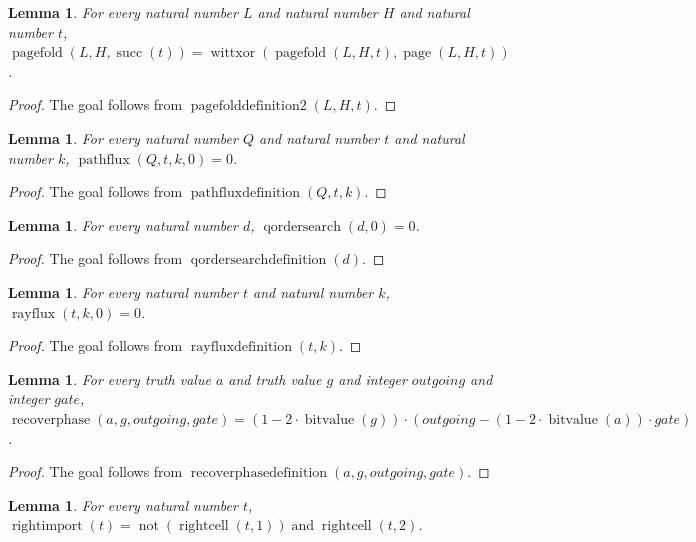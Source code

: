 \documentclass[11pt]{article}
\newtheorem{lemma}[theorem]{Lemma}
\theoremstyle{definition}
\begin{document}
\begin{lemma}
\label{ll:observations:page-fold-definition-2}
For every natural number \(L\) and natural number \(H\) and natural number \(t\), \(\operatorname{pagefold}(L, H, \operatorname{succ}(t)) = \operatorname{wittxor}(\operatorname{pagefold}(L, H, t), \operatorname{page}(L, H, t))\).
\end{lemma}
\begin{proof}
The goal follows from \(\operatorname{pagefolddefinition2}(L, H, t)\).
\end{proof}
\begin{lemma}
\label{ll:observations:path-flux-definition}
For every natural number \(Q\) and natural number \(t\) and natural number \(k\), \(\operatorname{pathflux}(Q, t, k, 0) = 0\).
\end{lemma}
\begin{proof}
The goal follows from \(\operatorname{pathfluxdefinition}(Q, t, k)\).
\end{proof}
\begin{lemma}
\label{ll:observations:q-order-search-definition}
For every natural number \(d\), \(\operatorname{qordersearch}(d, 0) = 0\).
\end{lemma}
\begin{proof}
The goal follows from \(\operatorname{qordersearchdefinition}(d)\).
\end{proof}
\begin{lemma}
\label{ll:observations:ray-flux-definition}
For every natural number \(t\) and natural number \(k\), \(\operatorname{rayflux}(t, k, 0) = 0\).
\end{lemma}
\begin{proof}
The goal follows from \(\operatorname{rayfluxdefinition}(t, k)\).
\end{proof}
\begin{lemma}
\label{ll:observations:recover-phase-definition}
For every truth value \(a\) and truth value \(g\) and integer \(outgoing\) and integer \(gate\), \(\operatorname{recoverphase}(a, g, outgoing, gate) = (1 - 2 \cdot \operatorname{bitvalue}(g)) \cdot (outgoing - (1 - 2 \cdot \operatorname{bitvalue}(a)) \cdot gate)\).
\end{lemma}
\begin{proof}
The goal follows from \(\operatorname{recoverphasedefinition}(a, g, outgoing, gate)\).
\end{proof}
\begin{lemma}
\label{ll:observations:right-import-definition}
For every natural number \(t\), \(\operatorname{rightimport}(t) = \operatorname{not}(\operatorname{rightcell}(t, 1)) \operatorname{and} \operatorname{rightcell}(t, 2)\).
\end{lemma}
\end{document}
